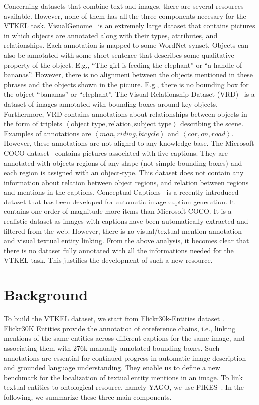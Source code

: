 \documentclass[11pt,a4paper]{article}
\begin{document}
Concerning datasets that combine text and images, there are several
resources available. However, none of them has all the three
components necesary for the VTKEL
task. VisualGenome~\cite{krishnavisualgenome} is an extremely large
dataset that contains pictures in which objects are annotated along
with their types, attributes, and relationships. Each annotation is mapped to
some WordNet synset. Objects can also be annotated with some short sentence that
describes some qualitative property of the object.  E.g., ``The girl is feeding the
elephant'' or ``a handle of bananas''. However, there is no alignment
between the objects mentioned in these phrases and the objects shown in
the picture. E.g., there is no bounding box for the object ``bananas'' or
``elephant''.  The Visual Relationship Dataset
(VRD)~\cite{lu2016visual} is a dataset of images annotated with
bounding boxes around key objects. Furthermore, VRD contains
annotations about relationships between objects in the form of triplets
$\left<\mbox{object\_type},\mbox{relation},\mbox{subject\_type}\right>$
describing the scene. Examples of annotations are
$\left<man,riding,bicycle\right>$ and $\left<car,on,road\right>$.
However, these annotations are not aligned to any knowledge base. The
Microsoft COCO dataset~\cite{lin2014microsoft} contains pictures associated
with five captions.  They are annotated with objects regions of any
shape (not simple bounding boxes) and each
region is assigned with an object-type. This dataset does not contain
any information about 
relation between object regions, and relation between regions and
mentions in the captions.  Conceptual Captions~\cite{sharma2018conceptual} is a
recently introduced dataset that has been developed for automatic image
caption generation. It contains one order of magnitude more items 
than Microsoft COCO. It is a realistic dataset as images with
captions have been automatically extracted and filtered from the
web. However, there is no visual/textual mention annotation and
visual textual entity linking.  From the above analysis, it becomes clear that 
there is no dataset fully annotated with all the informations needed for
the VTKEL task. This justifies the development of such a new resource.


\section{Background} \label{sec:background}

To build the VTKEL dataset, we start from Flickr30k-Entities dataset \cite{plummer2015flickr30k}.  Flickr30K Entities provide the annotation of coreference chains, i.e., linking mentions of the same entities across different captions for the same image, and associating them with 276k manually annotated bounding boxes. Such annotations are essential for continued progress in automatic image description and grounded language understanding. They enable us to define a new benchmark for the localization of textual entity mentions in an image. To link textual entities to ontological resource, namely YAGO, we use PIKES~\cite{corcoglioniti2016frame}. In the following, we summarize these three main components.
\end{document}

